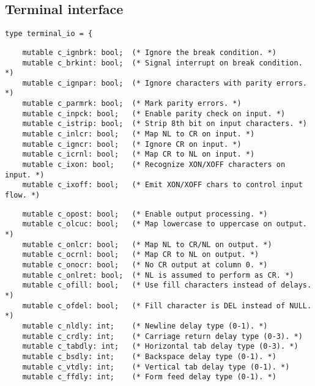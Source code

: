 \subsection*{Terminal interface }\begin{comment}
 The following functions implement the POSIX standard terminal
   interface. They provide control over asynchronous communication ports
   and pseudo-terminals. Refer to the \verbtermios man page for a
   complete description. 
\end{comment}
\begin{verbatim}
type terminal_io = {
\end{verbatim}
\begin{comment}
 Input modes: 
\end{comment}
\begin{verbatim}
    mutable c_ignbrk: bool;  (* Ignore the break condition. *)
    mutable c_brkint: bool;  (* Signal interrupt on break condition. *)
    mutable c_ignpar: bool;  (* Ignore characters with parity errors. *)
    mutable c_parmrk: bool;  (* Mark parity errors. *)
    mutable c_inpck: bool;   (* Enable parity check on input. *)
    mutable c_istrip: bool;  (* Strip 8th bit on input characters. *)
    mutable c_inlcr: bool;   (* Map NL to CR on input. *)
    mutable c_igncr: bool;   (* Ignore CR on input. *)
    mutable c_icrnl: bool;   (* Map CR to NL on input. *)
    mutable c_ixon: bool;    (* Recognize XON/XOFF characters on input. *)
    mutable c_ixoff: bool;   (* Emit XON/XOFF chars to control input flow. *)
\end{verbatim}
\begin{comment}
 Output modes: 
\end{comment}
\begin{verbatim}
    mutable c_opost: bool;   (* Enable output processing. *)
    mutable c_olcuc: bool;   (* Map lowercase to uppercase on output. *)
    mutable c_onlcr: bool;   (* Map NL to CR/NL on output. *)
    mutable c_ocrnl: bool;   (* Map CR to NL on output. *)
    mutable c_onocr: bool;   (* No CR output at column 0. *)
    mutable c_onlret: bool;  (* NL is assumed to perform as CR. *)
    mutable c_ofill: bool;   (* Use fill characters instead of delays. *)
    mutable c_ofdel: bool;   (* Fill character is DEL instead of NULL. *)
    mutable c_nldly: int;    (* Newline delay type (0-1). *)
    mutable c_crdly: int;    (* Carriage return delay type (0-3). *)
    mutable c_tabdly: int;   (* Horizontal tab delay type (0-3). *)
    mutable c_bsdly: int;    (* Backspace delay type (0-1). *)
    mutable c_vtdly: int;    (* Vertical tab delay type (0-1). *)
    mutable c_ffdly: int;    (* Form feed delay type (0-1). *)
\end{verbatim}
